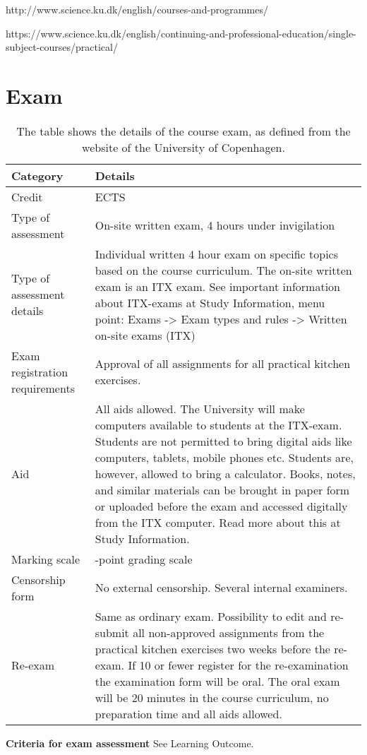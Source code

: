 http://www.science.ku.dk/english/courses-and-programmes/

https://www.science.ku.dk/english/continuing-and-professional-education/single-subject-courses/practical/

\section{Exam}
\newpage
\begin{table}[t]
    \centering
    \caption{The table shows the details of the course exam, as defined from the website of the University of Copenhagen.}
    \label{tab:course_details}
    \begin{tabular}{ l | >{\raggedright\arraybackslash}p{\textwidth - 5.8cm} }
        \textbf{Category} & \textbf{Details} \\ 
        \hline
        Credit & 7.5 ECTS \\ 

        Type of assessment & On-site written exam, 4 hours under invigilation \\ 

        Type of assessment details & Individual written 4 hour exam on specific topics based on the course curriculum. The on-site written exam is an ITX exam. See important information about ITX-exams at Study Information, menu point: Exams -> Exam types and rules -> Written on-site exams (ITX) \\ 

        Exam registration requirements & Approval of all assignments for all practical kitchen exercises. \\ 

        Aid & All aids allowed. The University will make computers available to students at the ITX-exam. Students are not permitted to bring digital aids like computers, tablets, mobile phones etc. Students are, however, allowed to bring a calculator. Books, notes, and similar materials can be brought in paper form or uploaded before the exam and accessed digitally from the ITX computer. Read more about this at Study Information. \\ 

        Marking scale & 7-point grading scale \\ 

        Censorship form & No external censorship. Several internal examiners. \\ 

        Re-exam & Same as ordinary exam. Possibility to edit and re-submit all non-approved assignments from the practical kitchen exercises two weeks before the re-exam. If 10 or fewer register for the re-examination the examination form will be oral. The oral exam will be 20 minutes in the course curriculum, no preparation time and all aids allowed. \\ 
    \end{tabular}
\end{table}

\textbf{Criteria for exam assessment}
See Learning Outcome.

